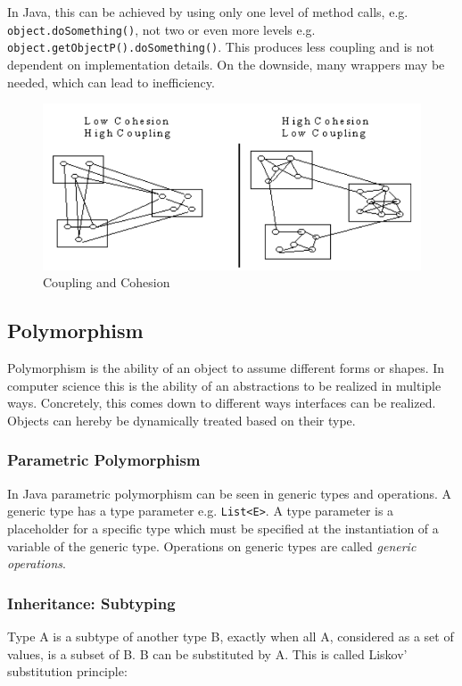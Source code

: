 In Java, this can be achieved by using only one level of method calls, e.g. \texttt{object.doSomething()}, not two or even more levels e.g. \texttt{object.getObjectP().doSomething()}.
This produces less coupling and is not dependent on implementation details. On the downside, many wrappers may be needed, which can lead to inefficiency.

\begin{figure}[h!]
	\centering
	\includegraphics[width=\linewidth]{images/oop_coupling_cohesion}
	\caption{Coupling and Cohesion}
\end{figure}


\subsection{Polymorphism}
Polymorphism is the ability of an object to assume different forms or shapes.
In computer science this is the ability of an abstractions to be realized in multiple ways.
Concretely, this comes down to different ways interfaces can be realized.
Objects can hereby be dynamically treated based on their type.

\subsubsection*{Parametric Polymorphism}
In Java parametric polymorphism can be seen in generic types and operations.
A generic type has a type parameter e.g. \texttt{List<E>}.
A type parameter is a placeholder for a specific type which must be specified at the instantiation of a variable of the generic type.
Operations on generic types are called \textit{generic operations}.

\subsubsection*{Inheritance: Subtyping}
Type A is a subtype of another type B, exactly when all A, considered as a set of values, is a subset of B. B can be substituted by A. This is called Liskov' substitution principle:\newline

